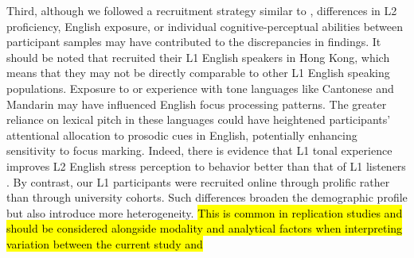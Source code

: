Third, although we followed a recruitment strategy similar to \cite{ge2021a}, differences in L2 proficiency, English exposure, or individual cognitive-perceptual abilities between participant samples may have contributed to the discrepancies in findings. It should be noted that \cite{ge2021a} recruited their L1 English speakers in Hong Kong, which means that they may not be directly comparable to other L1 English speaking populations. Exposure to or experience with tone languages like Cantonese and Mandarin may have influenced English focus processing patterns. The greater reliance on lexical pitch in these languages could have heightened participants’ attentional allocation to prosodic cues in English, potentially enhancing sensitivity to focus marking. Indeed, there is evidence that L1 tonal experience improves L2 English stress perception to behavior better than that of L1 listeners \parencite{choi2019better, choi2021cantonese}. By contrast, our L1 participants were recruited online through prolific rather than through university cohorts. Such differences broaden the demographic profile but also 
introduce more heterogeneity. \hl{This is common in replication studies and should be considered alongside modality and analytical factors when interpreting variation between the current study and \parencite{ge2021a}}


